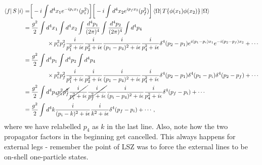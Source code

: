 \documentclass[11pt]{article}
\theoremstyle{definition}
\begin{document}
\begin{equation}
\begin{aligned}
        \bra{f}S\ket{i} &= \biggr[ -i\int d^4x_1e^{-ip_ix_1}(p_i^2) \biggr]\biggr[ -i\int d^4x_2 e^{ip_fx_2}(p_f^2) \biggr] \bra{\Omega}T\{\phi(x_1)\phi(x_2)\}\ket{\Omega}\\
        &= \frac{g^2}{2}\int d^4x_1 \int d^4x_2 \int \frac{d^4p_1}{(2\pi)^4}\int \frac{d^4p_2}{(2\pi)^4}\int d^4p_4 \\
        &\qquad \qquad \times p_i^2 p_f^2\frac{i}{p_1^2+i\epsilon}\frac{i}{p_2^2+i\epsilon}\frac{i}{(p_1-p_4)^2+i\epsilon}\frac{i} {p_4^2+i\epsilon}\delta^4(p_2-p_1) e^{i(p_1-p_i)x_1}e^{-i(p_2-p_f)x_2} + \cdots\\
        &= \frac{g^2}{2}\int d^4p_1\int d^4p_2\int d^4p_4 \\
        &\qquad \qquad \times p_i^2 p_f^2\frac{i}{p_1^2+i\epsilon}\frac{i}{p_2^2+i\epsilon}\frac{i}{(p_1-p_4)^2+i\epsilon}\frac{i} {p_4^2+i\epsilon}\delta^4(p_2-p_1) \delta^4(p_1-p_i) \delta^4(p_2-p_f) + \cdots\\
        &= \frac{g^2}{2} \int d^4p_4 \cancel{p_i^2 p_f^2}\cancel{\frac{i}{p_i^2+i\epsilon}}\cancel{\frac{i}{p_f^2+i\epsilon}}\frac{i}{(p_i-p_4)^2+i\epsilon}\frac{i} {p_4^2+i\epsilon}\delta^4(p_f-p_i) + \cdots\\
        &= \frac{g^2}{2} \int d^4k\frac{i}{(p_i-k)^2+i\epsilon}\frac{i} {k^2+i\epsilon}\delta^4(p_f-p_i) + \cdots,
\end{aligned}
\end{equation}
where we have relabelled $p_4$ as $k$ in the last line. Also, note how the two propagator factors in the beginning get cancelled. This always happens for external legs - remember the point of LSZ was to force the external lines to be on-shell one-particle states.
\end{document}
